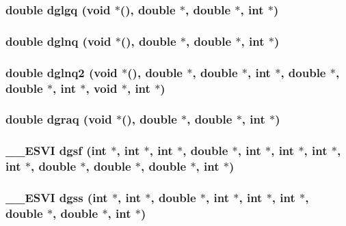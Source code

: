 \subsubsection{\setlength{\rightskip}{0pt plus 5cm}double dglgq (void $\ast$(), double $\ast$, double $\ast$, int $\ast$)}\label{essl_8h_2b1b2f6bd6190acc145d1a19e20079a9}


\subsubsection{\setlength{\rightskip}{0pt plus 5cm}double dglnq (void $\ast$(), double $\ast$, double $\ast$, int $\ast$)}\label{essl_8h_d8fa8380b446aed2f86318427dc9936b}


\subsubsection{\setlength{\rightskip}{0pt plus 5cm}double dglnq2 (void $\ast$(), double $\ast$, double $\ast$, int $\ast$, double $\ast$, double $\ast$, int $\ast$, void $\ast$, int $\ast$)}\label{essl_8h_694f3ef5425417c4ca43f01a34f7844d}


\subsubsection{\setlength{\rightskip}{0pt plus 5cm}double dgraq (void $\ast$(), double $\ast$, double $\ast$, int $\ast$)}\label{essl_8h_dac2071d9efd0616b0185f4624c86e17}


\subsubsection{\setlength{\rightskip}{0pt plus 5cm}\_\-\_\-ESVI dgsf (int $\ast$, int $\ast$, int $\ast$, double $\ast$, int $\ast$, int $\ast$, int $\ast$, int $\ast$, double $\ast$, double $\ast$, double $\ast$, int $\ast$)}\label{essl_8h_57059bd483b541a1417504c233b5d5ff}


\subsubsection{\setlength{\rightskip}{0pt plus 5cm}\_\-\_\-ESVI dgss (int $\ast$, int $\ast$, double $\ast$, int $\ast$, int $\ast$, int $\ast$, double $\ast$, double $\ast$, int $\ast$)}\label{essl_8h_2b7fcc59dda3eb31c3ff745640d7141d}


